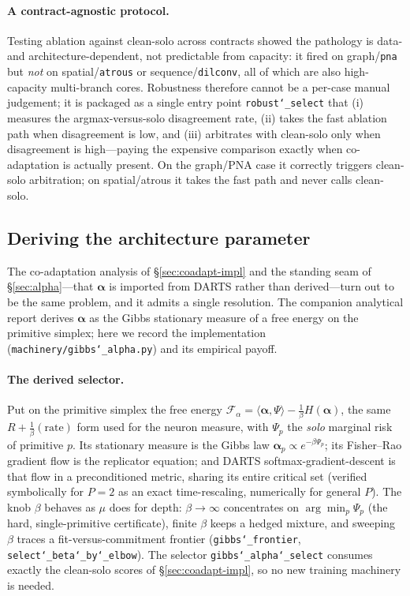 \documentclass[11pt]{article}
\newcommand{\allowbreakhere}{\discretionary{}{}{}}
\newcommand{\code}[1]{\texttt{\def\_{\char`_\allowbreakhere}#1}}
\newcommand{\alphapar}{\bm{\alpha}}
\newcommand{\F}{\mathcal{F}}
\begin{document}
\paragraph{A contract-agnostic protocol.} Testing ablation against clean-solo across contracts showed
the pathology is data- and architecture-dependent, not predictable from capacity: it fired on
graph/\code{pna} but \emph{not} on spatial/\code{atrous} or sequence/\code{dilconv}, all of which are
also high-capacity multi-branch cores. Robustness therefore cannot be a per-case manual judgement; it
is packaged as a single entry point \code{robust\_select} that (i) measures the argmax-versus-solo
disagreement rate, (ii) takes the fast ablation path when disagreement is low, and (iii) arbitrates
with clean-solo only when disagreement is high---paying the expensive comparison exactly when
co-adaptation is actually present. On the graph/PNA case it correctly triggers clean-solo arbitration;
on spatial/atrous it takes the fast path and never calls clean-solo.

\subsection{Deriving the architecture parameter}
\label{sec:alpha-derived}

The co-adaptation analysis of \S\ref{sec:coadapt-impl} and the standing seam of \S\ref{sec:alpha}---that
$\alphapar$ is imported from DARTS rather than derived---turn out to be the same problem, and it admits a
single resolution. The companion analytical report derives $\alphapar$ as the Gibbs stationary measure of
a free energy on the primitive simplex; here we record the implementation (\code{machinery/gibbs\_alpha.py})
and its empirical payoff.

\paragraph{The derived selector.} Put on the primitive simplex the free energy $\F_\alpha=\langle
\alphapar,\Psi\rangle-\tfrac1\beta H(\alphapar)$, the same $R+\tfrac1\beta(\text{rate})$ form used for the
neuron measure, with $\Psi_p$ the \emph{solo} marginal risk of primitive $p$. Its stationary measure is
the Gibbs law $\alphapar_p\propto e^{-\beta\Psi_p}$; its Fisher--Rao gradient flow is the replicator
equation; and DARTS softmax-gradient-descent is that flow in a preconditioned metric, sharing its entire
critical set (verified symbolically for $P=2$ as an exact time-rescaling, numerically for general $P$).
The knob $\beta$ behaves as $\mu$ does for depth: $\beta\to\infty$ concentrates on $\arg\min_p\Psi_p$
(the hard, single-primitive certificate), finite $\beta$ keeps a hedged mixture, and sweeping $\beta$
traces a fit-versus-commitment frontier (\code{gibbs\_frontier}, \code{select\_beta\_by\_elbow}). The
selector \code{gibbs\_alpha\_select} consumes exactly the clean-solo scores of \S\ref{sec:coadapt-impl},
so no new training machinery is needed.
\end{document}
